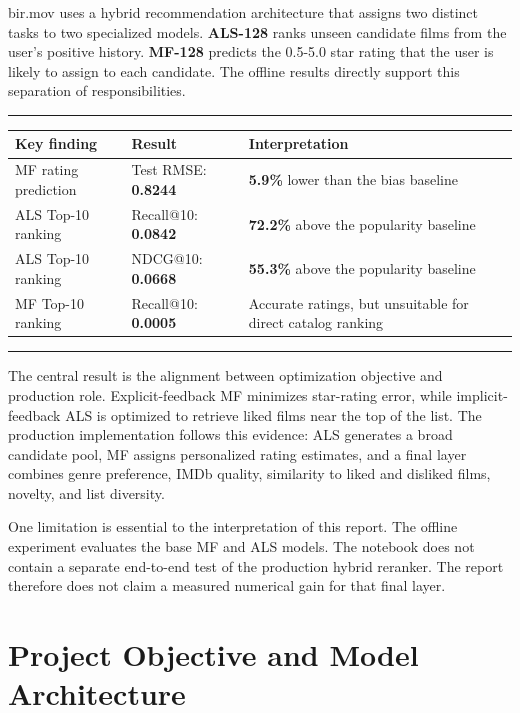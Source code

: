 \documentclass[11pt,a4paper]{article}
\newcommand{\metric}[1]{\textbf{\sffamily\color{Ink}#1}}
\newenvironment{keybox}
{\begin{center}\begin{minipage}{0.93\textwidth}\color{Ink}\hrule\vspace{0.7em}}
{\vspace{0.7em}\hrule\end{minipage}\end{center}}
\begin{document}
bir.mov uses a hybrid recommendation architecture that assigns two distinct tasks to two specialized models. \textbf{ALS-128} ranks unseen candidate films from the user's positive history. \textbf{MF-128} predicts the 0.5-5.0 star rating that the user is likely to assign to each candidate. The offline results directly support this separation of responsibilities.

\begin{keybox}
\begin{tabularx}{\textwidth}{@{}Y C{29mm} C{48mm}@{}}
\toprule
\textbf{Key finding} & \textbf{Result} & \textbf{Interpretation} \\
\midrule
MF rating prediction & Test RMSE: \metric{0.8244} & \metric{5.9\%} lower than the bias baseline \\
ALS Top-10 ranking & Recall@10: \metric{0.0842} & \metric{72.2\%} above the popularity baseline \\
ALS Top-10 ranking & NDCG@10: \metric{0.0668} & \metric{55.3\%} above the popularity baseline \\
MF Top-10 ranking & Recall@10: \metric{0.0005} & Accurate ratings, but unsuitable for direct catalog ranking \\
\bottomrule
\end{tabularx}
\end{keybox}

The central result is the alignment between optimization objective and production role. Explicit-feedback MF minimizes star-rating error, while implicit-feedback ALS is optimized to retrieve liked films near the top of the list. The production implementation follows this evidence: ALS generates a broad candidate pool, MF assigns personalized rating estimates, and a final layer combines genre preference, IMDb quality, similarity to liked and disliked films, novelty, and list diversity.

One limitation is essential to the interpretation of this report. The offline experiment evaluates the base MF and ALS models. The notebook does not contain a separate end-to-end test of the production hybrid reranker. The report therefore does not claim a measured numerical gain for that final layer.

\clearpage
{}

\section{Project Objective and Model Architecture}
\end{document}
